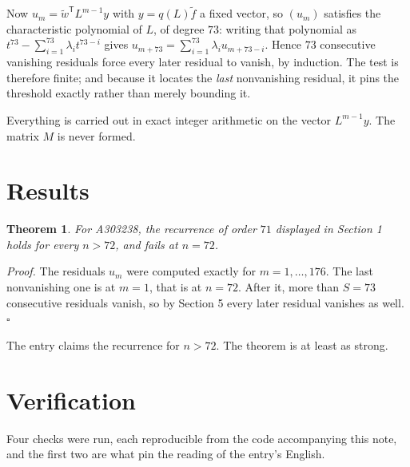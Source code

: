 \documentclass[11pt]{article}
\newtheorem{theorem}{Theorem}
\theoremstyle{definition}
\begin{document}
Now $u_m = \tilde w^{\mathsf T} L^{m-1} y$ with $y = q(L)\tilde f$ a fixed vector, so $(u_m)$ satisfies the characteristic polynomial of $L$, of degree $73$: writing that polynomial as $t^{73} - \sum_{i=1}^{73} \lambda_i t^{73-i}$ gives $u_{m+73} = \sum_{i=1}^{73} \lambda_i u_{m+73-i}$. Hence $73$ consecutive vanishing residuals force every later residual to vanish, by induction. The test is therefore finite; and because it locates the {\itshape last} nonvanishing residual, it pins the threshold exactly rather than merely bounding it.

Everything is carried out in exact integer arithmetic on the vector $L^{m-1}y$. The matrix $M$ is never formed.

\section{Results}

\begin{theorem} For A303238, the recurrence of order $71$ displayed in Section 1 holds for every $n > 72$, and fails at $n = 72$.\end{theorem}

{\itshape Proof.} The residuals $u_m$ were computed exactly for $m = 1,\dots,176$. The last nonvanishing one is at $m = 1$, that is at $n = 72$. After it, more than $S = 73$ consecutive residuals vanish, so by Section 5 every later residual vanishes as well. $\square$

The entry claims the recurrence for $n > 72$. The theorem is at least as strong.

\section{Verification}

Four checks were run, each reproducible from the code accompanying this note, and the first two are what pin the reading of the entry's English.
\end{document}
